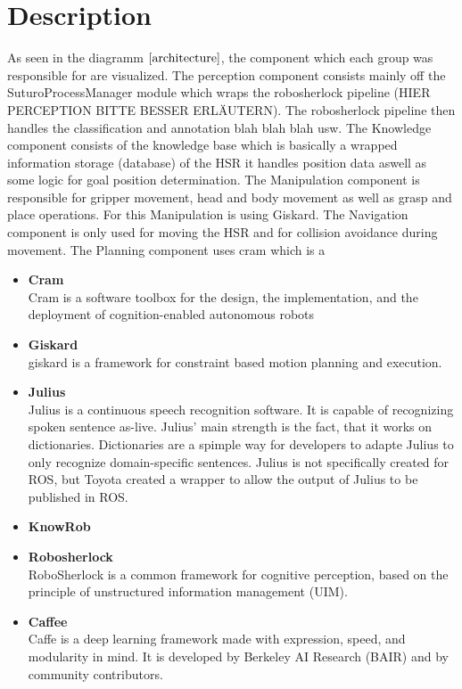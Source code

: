 \documentclass[main.tex]{subfiles}
\begin{document}
		\section{Description}
			As seen in the diagramm \(\ref{architecture}\), the component which each group was responsible for are visualized. The perception component consists mainly off the SuturoProcessManager module which wraps the robosherlock pipeline (HIER PERCEPTION BITTE BESSER ERLÄUTERN). The robosherlock pipeline then handles the classification and annotation blah blah blah usw. The Knowledge component consists of the knowledge base which is basically a wrapped information storage (database) of the HSR it handles position data aswell as some logic for goal position determination. The Manipulation component is responsible for gripper movement, head and body movement as well as grasp and place operations. For this Manipulation is using Giskard. The Navigation component is only used for moving the HSR and for collision avoidance during movement. The Planning component uses cram which is a 
			\begin{itemize}
				\item{\textbf{Cram}} \\
					 Cram is a software toolbox for the design, the implementation, and the deployment of cognition-enabled autonomous robots
				\item{\textbf{Giskard}} \\
					giskard is a  framework for constraint based motion planning and execution.
				\item{\textbf{Julius}} \\
					Julius is a continuous speech recognition software. It is capable of recognizing spoken sentence as-live. Julius' main strength is the fact, that it works on dictionaries. Dictionaries are a spimple way for developers to adapte Julius to only recognize domain-specific sentences. Julius is not specifically created for ROS, but Toyota created a wrapper to allow the output of Julius to be published in ROS.
				\item{\textbf{KnowRob}} \\
				\item{\textbf{Robosherlock}} \\
					RoboSherlock is a common framework for cognitive perception, based on the principle of unstructured information management (UIM).
				\item{\textbf{Caffee}} \\
					Caffe is a deep learning framework made with expression, speed, and modularity in mind. It is developed by Berkeley AI Research (BAIR) and by community contributors.

			\end{itemize}
		
\end{document}
